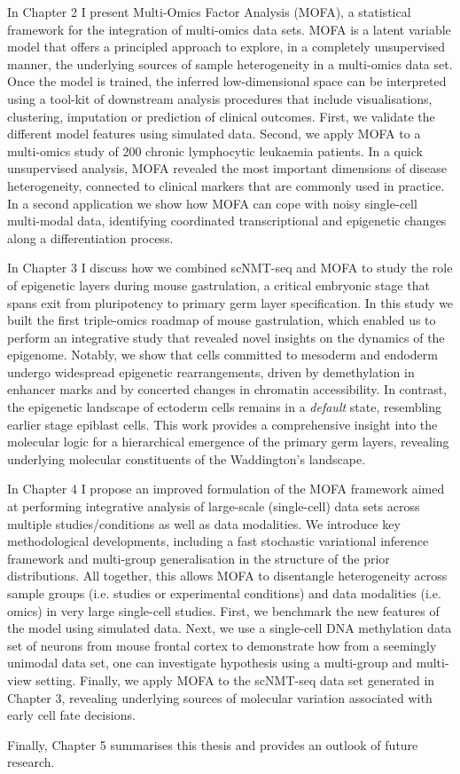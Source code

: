 In Chapter 2 I present Multi-Omics Factor Analysis (MOFA), a statistical framework for the integration of multi-omics data sets. MOFA is a latent variable model that offers a principled approach to explore, in a completely unsupervised manner, the underlying sources of sample heterogeneity in a multi-omics data set. Once the model is trained, the inferred low-dimensional space can be interpreted using a tool-kit of downstream analysis procedures that include visualisations, clustering, imputation or prediction of clinical outcomes. First, we validate the different model features using simulated data. Second, we apply MOFA to a multi-omics study of 200 chronic lymphocytic leukaemia patients. In a quick unsupervised analysis, MOFA revealed the most important dimensions of disease heterogeneity, connected to clinical markers that are commonly used in practice. In a second application we show how MOFA can cope with noisy single-cell multi-modal data, identifying coordinated transcriptional and epigenetic changes along a differentiation process.

In Chapter 3 I discuss how we combined scNMT-seq and MOFA to study the role of epigenetic layers during mouse gastrulation, a critical embryonic stage that spans exit from pluripotency to primary germ layer specification. In this study we built the first triple-omics roadmap of mouse gastrulation, which enabled us to perform an integrative study that revealed novel insights on the dynamics of the epigenome. Notably, we show that cells committed to mesoderm and endoderm undergo widespread epigenetic rearrangements, driven by demethylation in enhancer marks and by concerted changes in chromatin accessibility. In contrast, the epigenetic landscape of ectoderm cells remains in a \textit{default} state, resembling earlier stage epiblast cells. This work provides a comprehensive insight into the molecular logic for a hierarchical emergence of the primary germ layers, revealing underlying molecular constituents of the Waddington's landscape.

In Chapter 4 I propose an improved formulation of the MOFA framework aimed at performing integrative analysis of large-scale (single-cell) data sets across multiple studies/conditions as well as data modalities. We introduce key methodological developments, including a fast stochastic variational inference framework and multi-group generalisation in the structure of the prior distributions. All together, this allows MOFA to  disentangle heterogeneity across sample groups (i.e. studies or experimental conditions) and data modalities (i.e. omics) in very large single-cell studies. First, we benchmark the new features of the model using simulated data. Next, we use a single-cell DNA methylation data set of neurons from mouse frontal cortex to demonstrate how from a seemingly unimodal data set, one can investigate hypothesis using a multi-group and multi-view setting. Finally, we apply MOFA to the scNMT-seq data set generated in Chapter 3, revealing underlying sources of molecular variation associated with early cell fate decisions.

Finally, Chapter 5 summarises this thesis and provides an outlook of future research.